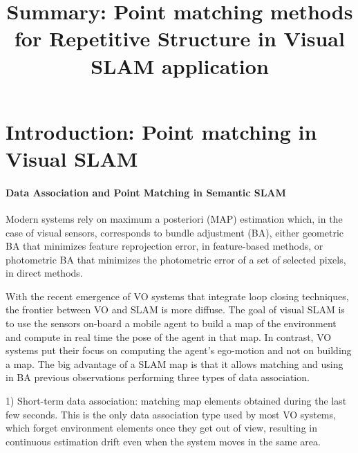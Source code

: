 \documentclass[review]{elsarticle}
\begin{document}
\begin{frontmatter}

\title{Summary: Point matching methods for Repetitive Structure in Visual SLAM application}

\begin{abstract}
\end{abstract}

\begin{keyword}
\end{keyword}

\end{frontmatter}

\linenumbers

\section{Introduction: Point matching in Visual SLAM}

\paragraph{Data Association and Point Matching in Semantic SLAM} 
Modern systems rely on maximum a posteriori (MAP) estimation which, in the case of visual sensors, corresponds to bundle adjustment (BA), either geometric BA that minimizes feature reprojection error, in feature-based methods, or photometric BA that minimizes the photometric error of a set of selected pixels, in direct methods. 

With the recent emergence of VO systems that integrate loop closing techniques, the frontier between VO and SLAM is more diffuse. The goal of visual SLAM is to use the sensors on-board a mobile agent to build a map of the environment and compute in real time the pose of the agent in that map. In contrast, VO systems put their focus on computing the agent’s ego-motion and not on building a map. The big advantage of a SLAM map is that it allows matching and using in BA previous observations performing three types of data association.

1) Short-term data association: matching map elements obtained during the last few seconds. This is the only data association type used by most VO systems, which forget environment elements once they get out of view, resulting in continuous estimation drift even when the system moves in the same area.
\end{document}
